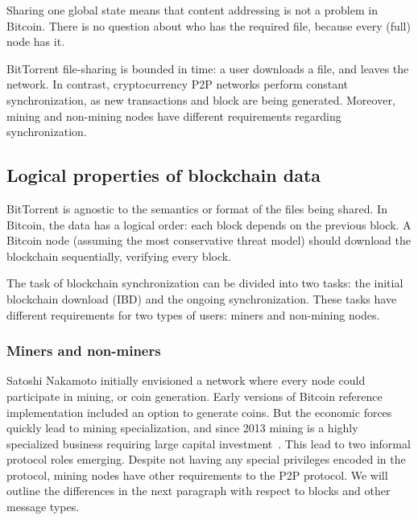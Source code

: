 Sharing one global state means that content addressing is not a problem in Bitcoin.
There is no question about who has the required file, because every (full) node has it.

BitTorrent file-sharing is bounded in time: a user downloads a file, and leaves the network.
In contrast, cryptocurrency P2P networks perform constant synchronization, as new transactions and block are being generated.
Moreover, mining and non-mining nodes have different requirements regarding synchronization.

\subsection{Logical properties of blockchain data}

BitTorrent is agnostic to the semantics or format of the files being shared.
In Bitcoin, the data has a logical order: each block depends on the previous block.
A Bitcoin node (assuming the most conservative threat model) should download the blockchain sequentially, verifying every block.

The task of blockchain synchronization can be divided into two tasks: the initial blockchain download (IBD) and the ongoing synchronization.
These tasks have different requirements for two types of users: miners and non-mining nodes.

\subsubsection*{Miners and non-miners}
Satoshi Nakamoto initially envisioned a network where every node could participate in mining, or coin generation.
Early versions of Bitcoin reference implementation included an option to generate coins.
But the economic forces quickly lead to mining specialization, and since 2013 mining is a highly specialized business requiring large capital investment~\cite{Kroll2013}.
This lead to two informal protocol roles emerging.
Despite not having any special privileges encoded in the protocol, mining nodes have other requirements to the P2P protocol.
We will outline the differences in the next paragraph with respect to blocks and other message types.
 
